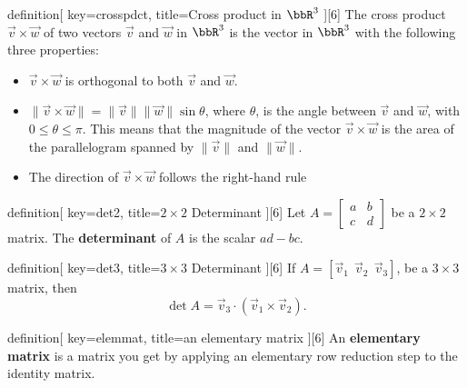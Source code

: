 
\begin{SaveConcept}{definition}[
		key=crosspdct,
		title={Cross product in $\bbR^3$}
	][6]
        The cross product $\vec v \times  \vec w$ of two vectors $\vec v$ and $\vec w$ in $\bbR^3$ is the vector in $\bbR^3$ with the following three properties:
        \begin{itemize}
            \item $\vec v \times  \vec w$ is orthogonal to both $\vec v$ and $\vec w$.
            \item $\|\vec v\times \vec w\|=\|\vec v\|\|\vec w\|\sin \theta$, where $\theta$, is the angle between $\vec v$ and $\vec w$, with $0 \leq  \theta \leq \pi$. This means that the magnitude of the vector $\vec v\times \vec w$ is the area of the parallelogram spanned by $\|\vec v\|$ and $\|\vec w\|$. 
            \item The direction of $\vec v\times \vec w$ follows the right-hand rule
        \end{itemize}
\end{SaveConcept}


\begin{SaveConcept}{definition}[
		key=det2,
		title={$2\times 2$ Determinant}
	][6]
	Let $A = \begin{bmatrix} a & b \\ c & d \end{bmatrix} $ be a $2 \times 2$ matrix. The {\bf determinant} of $A$ is the scalar $ad - bc$. 
\end{SaveConcept}


\begin{SaveConcept}{definition}[
		key=det3,
		title={$3\times 3$ Determinant}
	][6]
        If $A=[\vec v_1\:\:\vec v_2\:\:\vec v_3]$, be a $3\times 3$ matrix, then
        $$
        \det A=\vec v_3\cdot (\vec v_1\times \vec v_2). 
        $$
\end{SaveConcept}


\begin{SaveConcept}{definition}[
		key=elemmat,
		title={an elementary matrix}
	][6]
        An \textbf{elementary matrix} is a matrix you get by applying an elementary row reduction step to the identity matrix.
\end{SaveConcept}






